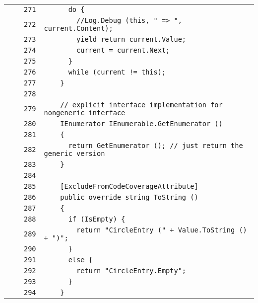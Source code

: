 \documentclass[a4paper,10pt]{article}
\begin{document}
\begin{longtable}[l]{lrrl}
\cellcolor{gray} &  & \verb~271~ & \verb~      do {~\\
\cellcolor{gray} &  & \verb~272~ & \verb~        //Log.Debug (this, " => ", current.Content);~\\
\cellcolor{gray} &  & \verb~273~ & \verb~        yield return current.Value;~\\
\cellcolor{gray} &  & \verb~274~ & \verb~        current = current.Next;~\\
\cellcolor{gray} &  & \verb~275~ & \verb~      }~\\
\cellcolor{gray} &  & \verb~276~ & \verb~      while (current != this);~\\
\cellcolor{gray} &  & \verb~277~ & \verb~    }~\\
\cellcolor{gray} &  & \verb~278~ & \verb~~\\
\cellcolor{gray} &  & \verb~279~ & \verb~    // explicit interface implementation for nongeneric interface~\\
\cellcolor{gray} &  & \verb~280~ & \verb~    IEnumerator IEnumerable.GetEnumerator ()~\\
\cellcolor{gray} &  & \verb~281~ & \verb~    {~\\
\cellcolor{gray} &  & \verb~282~ & \verb~      return GetEnumerator (); // just return the generic version~\\
\cellcolor{gray} &  & \verb~283~ & \verb~    }~\\
\cellcolor{gray} &  & \verb~284~ & \verb~~\\
\cellcolor{gray} &  & \verb~285~ & \verb~    [ExcludeFromCodeCoverageAttribute]~\\
\cellcolor{gray} &  & \verb~286~ & \verb~    public override string ToString ()~\\
\cellcolor{gray} &  & \verb~287~ & \verb~    {~\\
\cellcolor{gray} &  & \verb~288~ & \verb~      if (IsEmpty) {~\\
\cellcolor{gray} &  & \verb~289~ & \verb~        return "CircleEntry (" + Value.ToString () + ")";~\\
\cellcolor{gray} &  & \verb~290~ & \verb~      }~\\
\cellcolor{gray} &  & \verb~291~ & \verb~      else {~\\
\cellcolor{gray} &  & \verb~292~ & \verb~        return "CircleEntry.Empty";~\\
\cellcolor{gray} &  & \verb~293~ & \verb~      }~\\
\cellcolor{gray} &  & \verb~294~ & \verb~    }~\\

\end{longtable}
\end{document}
